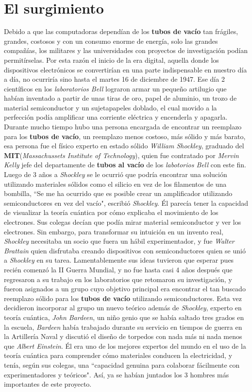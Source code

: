 \section*{El surgimiento}
Debido a que las computadoras dependían de los \textbf{tubos de vacío} tan frágiles, grandes,
costosos y con un consumo enorme de energía, solo las grandes compañías, los militares y las
universidades con proyectos de investigación podían permitírselas. Por esta razón el inicio de la
era digital, aquella donde los dispositivos electrónicos se convertirían en una parte indispensable
en nuestro día a día, no ocurriría sino hasta el martes 16 de diciembre de 1947. Ese día 2 científicos
en los \emph{laboratorios Bell} lograron armar un pequeño artilugio que habían inventado a partir de
unas tiras de oro, papel de aluminio, un trozo de material semiconductor y un sujetapapeles doblado,
el cual movido a la perfección podía amplificar una corriente eléctrica y encenderla y apagarla.\\
Durante mucho tiempo hubo una persona encargada de encontrar un reemplazo para los \textbf{tubos 
de vacío}, un reemplazo menos costoso, más sólido y más barato, esa persona fue el físico experto
en estado sólido \emph{William Shockley}, graduado del \textbf{MIT}(\emph{Massachussets Institute of Technology}),
quien fue contratado por \emph{Mervin Kelly} jefe del departamente de \textbf{tubos al vacío} de los \emph{
labotorios Bell} con este fin. Luego de 3 años a \emph{Shockley} se le ocurrió que podría encontrar una
solución utilizando materiales sólidos como el silicio en vez de los filamentos de una bombilla, “Se 
me ha ocurrido que es posible crear un amplificador utilizando semiconductores en vez del vacío",
escribió \emph{Shockley}. Él parecía tener la capacidad de visualizar la teoría cuántica por cómo explicaba
el movimiento de los electrones. Sus colegas decían que podía mirar material semiconductor y ver los
electrones. Sin embargo, para transformar su intuición en un invento real, \emph{Shockley} necesitaba
un socio que fuera un hábil experimentador, y fue \emph{Walter Brattain} quien disfrutaba creando
dispositivos con semiconductores quien se unió a \emph{Shockley} en su tarea. Lamentablemente sus
ideas tuvieron que esperar pues recién comenzó la II Guerra Mundial, y no fue hasta casi 4 años
después que regresaron a su trabajo en los laboratorios que retomaron su investigación, y fueron
asignados a un grupo cuyo objetivo principal era encontrar el tan buscado reemplazo sólido para
los \textbf{tubos de vacío} utilizando semiconductores. Esta vez decidieron incorporar al grupo un 
nuevo teórico además de \emph{Shockley}, experto en teoría cuántica, \emph{John Bardeen}, un niño
genio que se había saltado tres grados en la escuela, \emph{Bardeen } había trabajado durante su servicio
en tiempos de guerra en la Artillería Naval y discutió el diseño de torpedos con nada más ni nada menos que 
\emph{Albert Einstein}. Él era uno de los mejores expertos del mundo en el uso de la teoría cuántica
para comprender cómo materiales conducen la electricidad, y tenía, según sus colegas, una “capacidad genuina
para colaborar fácilmente con experimentadores y teóricos". Así, ya se habían juntados los 3 hombres más importantes
de este proyecto.\\
\newpage


